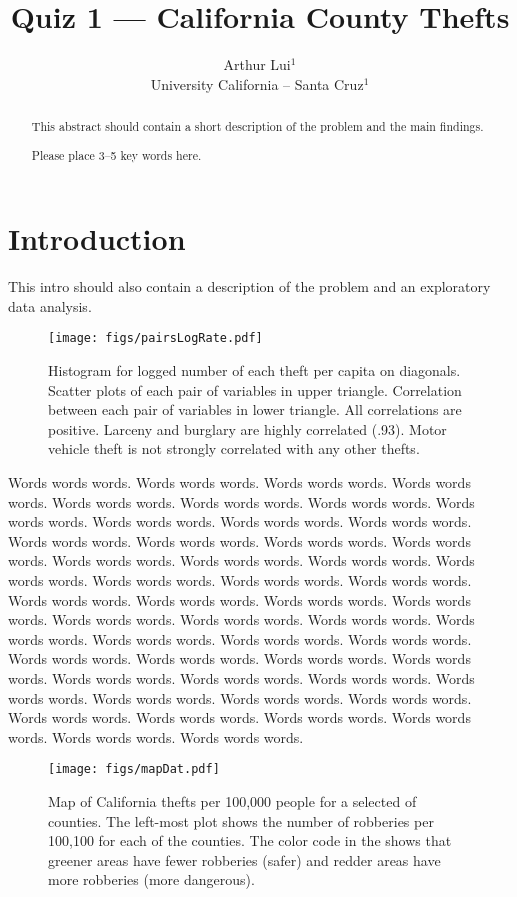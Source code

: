\documentclass{../../tex_template/asaproc}
\title{Quiz 1 --- California County Thefts}
\author{
  Arthur Lui$^1$\\
  University California -- Santa Cruz$^1$\\
}
\begin{document}
\maketitle


\begin{abstract}
 This abstract should contain a short description of the problem and the main findings.
\begin{keywords}
Please place 3--5 key words here.
\end{keywords}
\end{abstract}


\section{Introduction}
This intro should also contain a description of the problem and an exploratory data analysis.

\begin{figure}[H]
  \texttt{[image: figs/pairsLogRate.pdf]}
  \label{fig:logRate}
  \caption{\small Histogram for logged number of each theft per capita on diagonals. Scatter plots
  of each pair of variables in upper triangle. Correlation between each pair of variables in
  lower triangle. All correlations are positive. Larceny and burglary are highly correlated (.93). 
  Motor vehicle theft is not strongly correlated with any other thefts.}
\end{figure}

Words words words.  Words words words.  Words words words.  Words words words.  Words words words.
Words words words.  Words words words.  Words words words.  Words words words.  Words words words.
Words words words.  Words words words.  Words words words.  Words words words.  Words words words.
Words words words.  Words words words.  Words words words.  Words words words.  Words words words.
Words words words.  Words words words.  Words words words.  Words words words.  Words words words.
Words words words.  Words words words.  Words words words.  Words words words.  Words words words.
Words words words.  Words words words.  Words words words.  Words words words.  Words words words.
Words words words.  Words words words.  Words words words.  Words words words.  Words words words.
Words words words.  Words words words.  Words words words.  Words words words.  Words words words.
Words words words.  Words words words.  Words words words.  Words words words.  Words words words.
\begin{figure*}
  \centering
  \texttt{[image: figs/mapDat.pdf]}
  \vspace{-7em}
  \caption{Map of California thefts per 100,000 people for a selected of counties. The left-most plot
  shows the number of robberies per 100,100 for each of the counties. The color code in the shows that
greener areas have fewer robberies (safer) and redder areas have more robberies (more dangerous).}
  \label{fig:mapDat}
\end{figure*}
\end{document}
